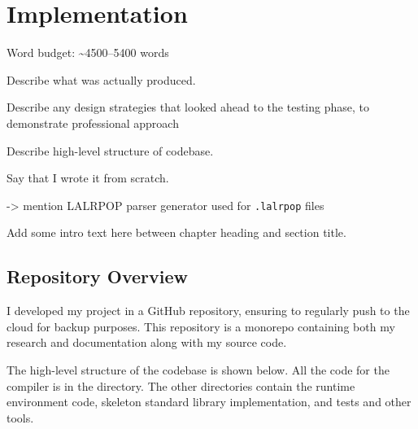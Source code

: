 \documentclass[00-main.tex]{subfiles}
\begin{document}
\chapter{Implementation}

\begin{mrwComment}
Word budget: \textasciitilde4500--5400 words
\end{mrwComment}

\begin{mrwComment}
Describe what was actually produced.

Describe any design strategies that looked ahead to the testing phase, to demonstrate professional approach
\end{mrwComment}
\begin{mrwComment}
Describe high-level structure of codebase.

Say that I wrote it from scratch.

-> mention LALRPOP parser generator used for \texttt{.lalrpop} files
\end{mrwComment}

\begin{mrwComment}
Add some intro text here between chapter heading and section title.
\end{mrwComment}

\section{Repository Overview}

I developed my project in a GitHub repository, ensuring to regularly push to the cloud for backup purposes.
This repository is a monorepo containing both my research and documentation along with my source code.

The high-level structure of the codebase is shown below.
All the code for the compiler is in the  directory.
The other directories contain the runtime environment code, skeleton standard library implementation, and tests and other tools.

\newlength\IndentWidth\setlength\IndentWidth{1em}
\end{document}
